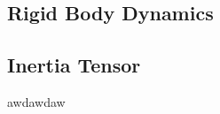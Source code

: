\documentclass[a4paper, 12pt]{report}
\begin{document}
\begin{center}
\chapter{Rigid Body Dynamics}
\begin{comment}
\end{comment}
\section{Inertia Tensor}
\begin{comment}
\end{comment}
awdawdaw
\end{center}
\end{document}
